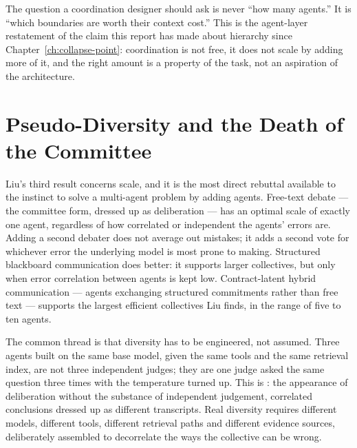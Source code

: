 \begin{keyinsight}
The question a coordination designer should ask is never ``how many agents.'' It is ``which boundaries are worth their context cost.'' This is the agent-layer restatement of the claim this report has made about hierarchy since Chapter~\ref{ch:collapse-point}: coordination is not free, it does not scale by adding more of it, and the right amount is a property of the task, not an aspiration of the architecture.
\end{keyinsight}

\section{Pseudo-Diversity and the Death of the Committee}

Liu's third result concerns scale, and it is the most direct rebuttal available to the instinct to solve a multi-agent problem by adding agents. Free-text debate --- the committee form, dressed up as deliberation --- has an optimal scale of exactly one agent, regardless of how correlated or independent the agents' errors are. Adding a second debater does not average out mistakes; it adds a second vote for whichever error the underlying model is most prone to making. Structured blackboard communication does better: it supports larger collectives, but only when error correlation between agents is kept low. Contract-latent hybrid communication --- agents exchanging structured commitments rather than free text --- supports the largest efficient collectives Liu finds, in the range of five to ten agents.

The common thread is that diversity has to be engineered, not assumed. Three agents built on the same base model, given the same tools and the same retrieval index, are not three independent judges; they are one judge asked the same question three times with the temperature turned up. This is : the appearance of deliberation without the substance of independent judgement, correlated conclusions dressed up as different transcripts. Real diversity requires different models, different tools, different retrieval paths and different evidence sources, deliberately assembled to decorrelate the ways the collective can be wrong.

